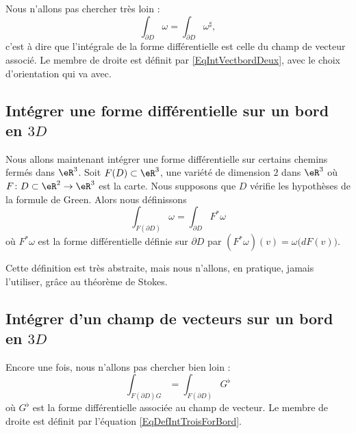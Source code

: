 Nous n'allons pas chercher très loin :
\begin{equation}
	\int_{\partial D}\omega=\int_{\partial D}\omega^{\sharp},
\end{equation}
c'est à dire que l'intégrale de la forme différentielle est celle du champ de vecteur associé. Le membre de droite est définit par \eqref{EqIntVectbordDeux}, avec le choix d'orientation qui va avec.

\subsection{Intégrer une forme différentielle sur un bord en $3D$}

Nous allons maintenant intégrer une forme différentielle sur certains chemins fermés dans $\eR^3$. Soit $F(D)\subset\eR^3$, une variété de dimension $2$ dans $\eR^3$ où $F\colon D\subset\eR^2\to \eR^3$ est la carte. Nous supposons que $D$ vérifie les hypothèses de la formule de Green. Alors nous définissons
\begin{equation}		\label{EqDefIntTroisForBord}
	\int_{F(\partial D)}\omega = \int_{\partial D} F^*\omega
\end{equation}
où $F^*\omega$ est la forme différentielle définie sur $\partial D$ par $(F^*\omega)(v)=\omega\big( dF(v) \big)$.

Cette définition est très abstraite, mais nous n'allons, en pratique, jamais l'utiliser, grâce au théorème de Stokes.

\subsection{Intégrer d'un champ de vecteurs sur un bord en $3D$}

Encore une fois, nous n'allons pas chercher bien loin :
\begin{equation}
	\int_{F(\partial D)G}=\int_{F(\partial D)}G^{\flat}
\end{equation}
où $G^{\flat}$ est la forme différentielle associée au champ de vecteur. Le membre de droite est définit par l'équation \eqref{EqDefIntTroisForBord}.

